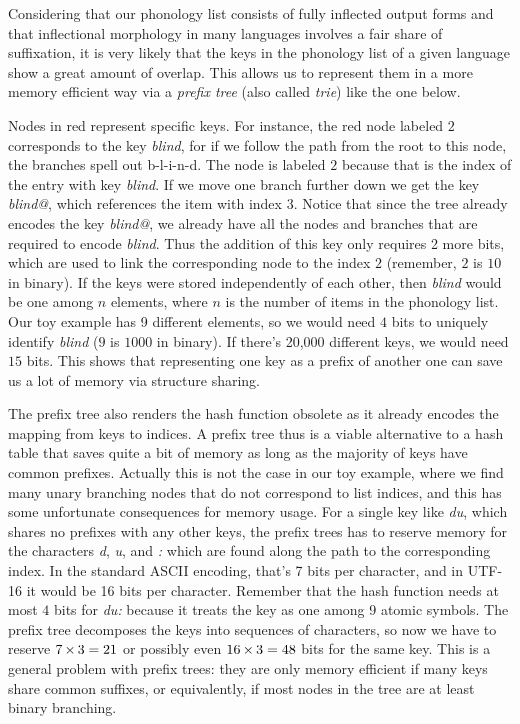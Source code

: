 Considering that our phonology list consists of fully inflected output forms and that inflectional morphology in many languages involves a fair share of suffixation,  it is very likely that the keys in the phonology list of a given language show a great amount of overlap.
This allows us to represent them in a more memory efficient way via a \emph{prefix tree} (also called \emph{trie}) like the one below.
%
\begin{center}
    
\end{center}
%
Nodes in red represent specific keys.
For instance, the red node labeled $2$ corresponds to the key \emph{blind}, for if we follow the path from the root to this node, the branches spell out b-l-i-n-d.
The node is labeled $2$ because that is the index of the entry with key \emph{blind}.
If we move one branch further down we get the key \emph{blind@}, which references the item with index $3$.
Notice that since the tree already encodes the key \emph{blind@}, we already have all the nodes and branches that are required to encode \emph{blind}.
Thus the addition of this key only requires 2 more bits, which are used to link the corresponding node to the index $2$ (remember, $2$ is $10$ in binary).
If the keys were stored independently of each other, then \emph{blind} would be one among $n$ elements, where $n$ is the number of items in the phonology list.
Our toy example has 9 different elements, so we would need $4$ bits to uniquely identify \emph{blind} ($9$ is $1000$ in binary).
If there's 20,000 different keys, we would need $15$ bits.
This shows that representing one key as a prefix of another one can save us a lot of memory via structure sharing.

The prefix tree also renders the hash function obsolete as it already encodes the mapping from keys to indices.
A prefix tree thus is a viable alternative to a hash table that saves quite a bit of memory as long as the majority of keys have common prefixes.
Actually this is not the case in our toy example, where we find many unary branching nodes that do not correspond to list indices, and this has some unfortunate consequences for memory usage.
For a single key like \emph{du}, which shares no prefixes with any other keys, the prefix trees has to reserve memory for the characters \emph{d}, \emph{u}, and \emph{:} which are found along the path to the corresponding index.
In the standard ASCII encoding, that's 7 bits per character, and in UTF-16 it would be 16 bits per character.
Remember that the hash function needs at most $4$ bits for \emph{du:} because it treats the key as one among 9 atomic symbols.
The prefix tree decomposes the keys into sequences of characters, so now we have to reserve $7 \mathop{\times} 3 = 21$ or possibly even $16 \mathop{\times} 3 = 48$ bits for the same key.
This is a general problem with prefix trees: they are only memory efficient if many keys share common suffixes, or equivalently, if most nodes in the tree are at least binary branching.

